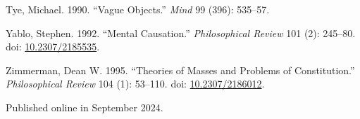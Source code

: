 \documentclass[
  10pt,
  letterpaper,
  DIV=11,
  numbers=noendperiod,
  twoside]{scrartcl}
\newlength{\cslhangindent}
\newenvironment{CSLReferences}[2] %
 {\begin{list}{}{%
  \setlength{\itemindent}{0pt}
  \setlength{\leftmargin}{0pt}
  \setlength{\parsep}{0pt}
  \ifodd #1
   \setlength{\leftmargin}{\cslhangindent}
   \setlength{\itemindent}{-1\cslhangindent}
  \fi
  \setlength{\itemsep}{#2\baselineskip}}}
 {\end{list}}
\begin{document}
\begin{CSLReferences}{1}{0}
Tye, Michael. 1990. {``Vague Objects.''} \emph{Mind} 99 (396): 535--57.

Yablo, Stephen. 1992. {``Mental Causation.''} \emph{Philosophical
Review} 101 (2): 245--80. doi:
\href{https://doi.org/10.2307/2185535}{10.2307/2185535}.

Zimmerman, Dean W. 1995. {``Theories of Masses and Problems of
Constitution.''} \emph{Philosophical Review} 104 (1): 53--110. doi:
\href{https://doi.org/10.2307/2186012}{10.2307/2186012}.

\end{CSLReferences}



\noindent Published online in September 2024.
\end{document}
